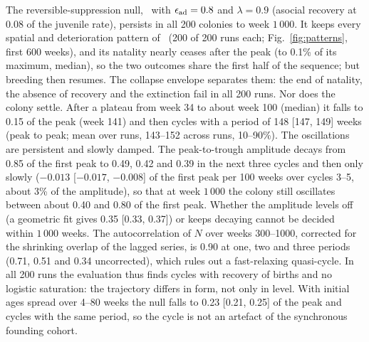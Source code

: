 The reversible-suppression null, \Cone\ with $\epsilon_{\rm ad}=0.8$ and $\lambda=0.9$ (asocial recovery at 0.08 of the
juvenile rate), persists in all 200 colonies to week
$1\,000$. It keeps every spatial and deterioration pattern of \Cone\ (200 of 200 runs each; Fig.~\ref{fig:patterns},
first 600 weeks), and its natality nearly ceases after the peak (to 0.1\% of its maximum, median), so the two
outcomes share the first half of the sequence; but breeding then resumes. The collapse envelope separates them: the
end of natality, the absence of recovery and the extinction fail in all 200 runs. Nor does the colony settle. After
a plateau from week 34 to about week 100 (median) it falls to 0.15 of the peak (week 141) and then cycles with a
period of 148 [147, 149] weeks (peak to peak; mean over runs, 143--152 across runs, 10--90\%). The oscillations are
persistent and slowly damped. The peak-to-trough amplitude decays from 0.85 of the first peak to 0.49, 0.42 and 0.39
in the next three cycles and then only slowly ($-0.013$ [$-0.017$, $-0.008$] of the first peak per 100 weeks over
cycles 3--5, about 3\% of the amplitude), so that at week $1\,000$ the colony still oscillates between about 0.40
and 0.80 of the first peak. Whether the amplitude levels off (a geometric fit gives 0.35 [0.33, 0.37]) or keeps
decaying cannot be decided within $1\,000$ weeks. The autocorrelation of $N$ over weeks 300--1000, corrected for the
shrinking overlap of the lagged series, is 0.90 at one, two and three periods (0.71, 0.51 and 0.34 uncorrected),
which rules out a fast-relaxing quasi-cycle. In all 200 runs the evaluation
thus finds cycles with recovery of births and no logistic saturation: the trajectory differs in form, not only in
level. With initial ages spread over 4--80 weeks the null falls to 0.23 [0.21, 0.25] of the peak and cycles with the
same period, so the cycle is not an artefact of the synchronous founding cohort.

